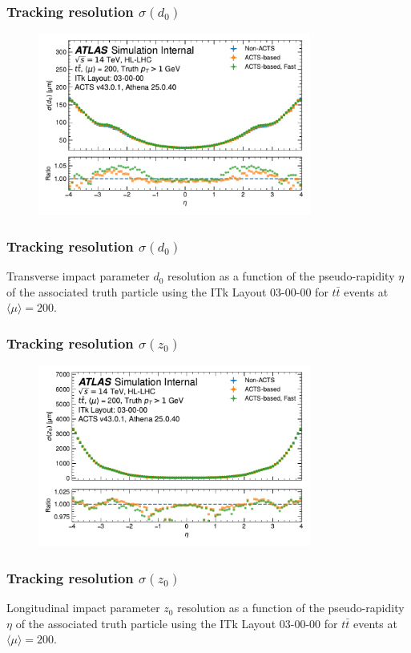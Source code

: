 \documentclass[aspectratio=169]{beamer}
\begin{document}
\begin{frame}
\frametitle{Tracking resolution $\sigma(d_0)$}
\begin{figure}[h]
    \centering
    \includegraphics[width=0.8\textwidth]{plots/tracking_resolution_d0.pdf}
\end{figure}
\end{frame}

\begin{frame}
\frametitle{Tracking resolution $\sigma(d_0)$}
Transverse impact parameter $d_0$ resolution as a function of the pseudo-rapidity $\eta$ of the associated truth particle using the ITk Layout 03-00-00 for $t\bar{t}$ events at $\langle \mu \rangle = 200$.
\end{frame}

\begin{frame}
\frametitle{Tracking resolution $\sigma(z_0)$}
\begin{figure}[h]
    \centering
    \includegraphics[width=0.8\textwidth]{plots/tracking_resolution_z0.pdf}
\end{figure}
\end{frame}

\begin{frame}
\frametitle{Tracking resolution $\sigma(z_0)$}
Longitudinal impact parameter $z_0$ resolution as a function of the pseudo-rapidity $\eta$ of the associated truth particle using the ITk Layout 03-00-00 for $t\bar{t}$ events at $\langle \mu \rangle = 200$.
\end{frame}
\end{document}
